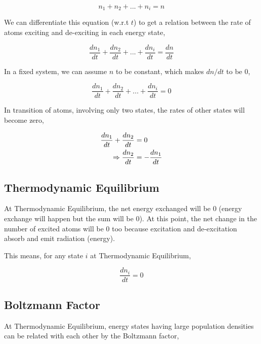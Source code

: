 \documentclass[12pt]{article}
\begin{document}
\begin{equation}
    n_{1} + n_{2} + ... + n_{i} = n
\end{equation}

We can differentiate this equation (w.r.t $t$) to get a relation between the rate of atoms exciting and de-exciting in each energy state,

\begin{equation*}
    \frac{dn_{1}}{dt} + \frac{dn_{2}}{dt} + ... + \frac{dn_{i}}{dt} = \frac{dn}{dt}
\end{equation*}

In a fixed system, we can assume $n$ to be constant, which makes $dn/dt$ to be 0,

\begin{equation*}
    \frac{dn_{1}}{dt} + \frac{dn_{2}}{dt} + ... + \frac{dn_{i}}{dt} = 0
\end{equation*}

In transition of atoms, involving only two states, the rates of other states will become zero,

\begin{align}
    \frac{dn_{1}}{dt} + \frac{dn_{2}}{dt} & = 0 \notag \\
    \Rightarrow \frac{dn_{2}}{dt} & = -\frac{dn_{1}}{dt}
\end{align}

\subsection{Thermodynamic Equilibrium}

At Thermodynamic Equilibrium, the net energy exchanged will be 0 (energy exchange will happen but the sum will be 0). At this point, the net change in the number of excited atoms will be 0 too because excitation and de-excitation absorb and emit radiation (energy).

This means, for any state $i$ at Thermodynamic Equilibrium, 

\begin{equation}
    \frac{dn_{i}}{dt} = 0
\end{equation}

\subsection{Boltzmann Factor}

At Thermodynamic Equilibrium, energy states having large population densities can be related with each other by the Boltzmann factor,
\end{document}
